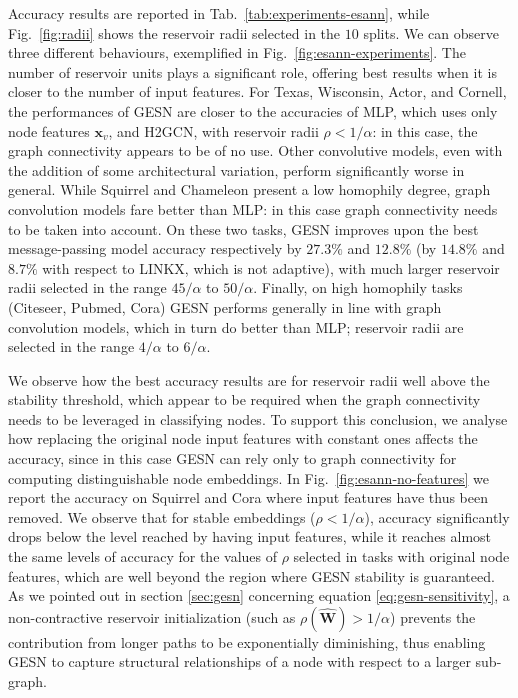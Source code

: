 \documentclass[final,5p,times,twocolumn]{elsarticle}
\begin{document}
Accuracy results are reported in Tab.~\ref{tab:experiments-esann}, while Fig.~\ref{fig:radii} shows the reservoir radii selected in the $10$ splits.
We can observe three different behaviours, exemplified in Fig.~\ref{fig:esann-experiments}.
The number of reservoir units plays a significant role, offering best results when it is closer to the number of input features.
For Texas, Wisconsin, Actor, and Cornell, the performances of GESN are closer to the accuracies of MLP, which uses only node features $\mathbf{x}_v$, and H2GCN, with reservoir radii $\rho < 1/\alpha$: in this case, the graph connectivity appears to be of no use.
Other convolutive models, even with the addition of some architectural variation, perform significantly worse in general.
While Squirrel and Chameleon present a low homophily degree, graph convolution models fare better than MLP: in this case graph connectivity needs to be taken into account.
On these two tasks, GESN improves upon the best message-passing model accuracy respectively by $27.3\%$ and $12.8\%$ (by $14.8\%$ and $8.7\%$ with respect to LINKX, which is not adaptive), with much larger reservoir radii selected in the range $45/\alpha$ to $50/\alpha$.
Finally, on high homophily tasks (Citeseer, Pubmed, Cora) GESN performs generally in line with graph convolution models, which in turn do better than MLP; reservoir radii are selected in the range $4/\alpha$ to $6/\alpha$.

We observe how the best accuracy results are for reservoir radii well above the stability threshold, which appear to be required when the graph connectivity needs to be leveraged in classifying nodes.
To support this conclusion, we analyse how replacing the original node input features with constant ones affects the accuracy, since in this case GESN can rely only to graph connectivity for computing distinguishable node embeddings.
In Fig.~\ref{fig:esann-no-features} we report the accuracy on Squirrel and Cora where input features have thus been removed.
We observe that for stable embeddings ($\rho < 1 / \alpha$), accuracy significantly drops below the level reached by having input features, while it reaches almost the same levels of accuracy for the values of $\rho$ selected in tasks with original node features, which are well beyond the region where GESN stability is guaranteed.
As we pointed out in section \ref{sec:gesn} concerning equation \eqref{eq:gesn-sensitivity}, a non-contractive reservoir initialization (such as $\rho(\mathbf{\hat{W}}) > 1/\alpha$) prevents the contribution from longer paths to be exponentially diminishing, thus enabling GESN to capture structural relationships of a node with respect to a larger sub-graph.
\end{document}
